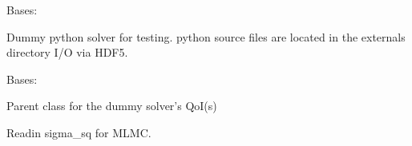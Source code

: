 \documentclass[letterpaper,10pt,english]{sphinxmanual}
\begin{document}
\begin{fulllineitems}
\label{\detokenize{solver:solver.internal.Internal}}
Bases: {\hyperref[\detokenize{solver:solver.solver.Solver}]{}}

Dummy python solver for testing.
python source files are located in the externals directory
I/O via HDF5.

\begin{fulllineitems}
\label{\detokenize{solver:solver.internal.Internal.QoI}}
Bases: {\hyperref[\detokenize{solver:solver.solver.QoI}]{}}

Parent class for the dummy solver’s QoI(s)

\begin{fulllineitems}
\label{\detokenize{solver:solver.internal.Internal.QoI.get_derived_quantity}}
Readin sigma\_sq for MLMC.

\end{fulllineitems}


\begin{fulllineitems}
\label{\detokenize{solver:solver.internal.Internal.QoI.get_work_mean}}
\end{fulllineitems}


\end{fulllineitems}


\begin{fulllineitems}
\label{\detokenize{solver:solver.internal.Internal.defaults_}}
\end{fulllineitems}


\end{fulllineitems}
\end{document}
